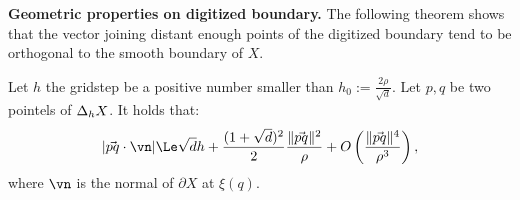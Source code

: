 \noindent\textbf{Geometric properties on digitized boundary.}
The following theorem shows that the vector joining distant enough
points of the digitized boundary tend to be orthogonal to the smooth
boundary of $X$.
\begin{theorem}\label{bound-pq-dot-n}
    Let $h$ the gridstep be a positive number smaller than $h_0 :=
    \frac{2\rho}{\sqrt{d}}$. Let $p, q$ be two pointels of
    $\Delta_{h} {X}$. It holds that:
    \begin{align}
        \label{eq-pq-dot-n-upper-bound}
        |\vec{pq} \cdot \vn| \Le \sqrt{d}h + \frac{(1+\sqrt{d})^2}{2}
        \frac{\|\vec{pq}\|^2}{\rho} + O\left(
                                           \frac{\|\vec{pq}\|^4}{\rho^3} \right),
    \end{align}
    where $\vn$ is the normal of $\partial X$ at $\xi(q)$.
\end{theorem}
